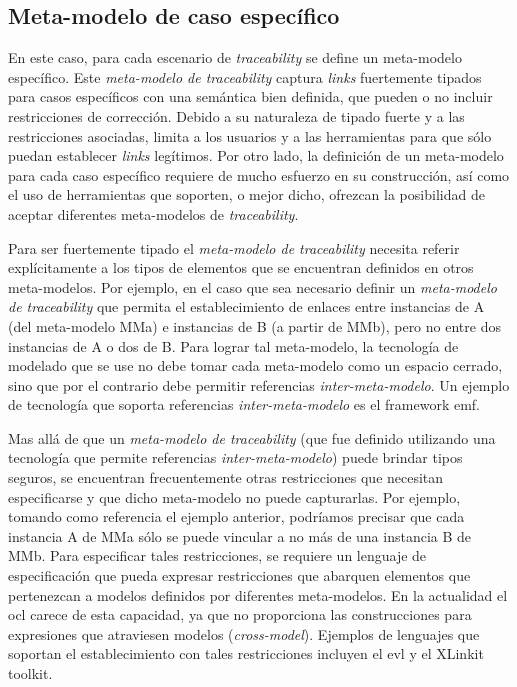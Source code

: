 \documentclass[a4paper,12pt,twoside,spanish,openright]{book}
\begin{document}
\subsection{Meta-modelo de caso específico}

En este caso, para cada escenario de \textit{traceability} se define un meta-modelo específico. Este \textit{meta-modelo de traceability} captura \textit{links} fuertemente tipados para casos específicos con una semántica bien definida, que pueden o no incluir restricciones de corrección. Debido a su naturaleza de tipado fuerte y a las restricciones asociadas, limita a los usuarios y a las herramientas para que sólo puedan establecer \textit{links} legítimos. Por otro lado, la definición de un meta-modelo para cada caso específico requiere de mucho esfuerzo en su construcción, así como el uso de herramientas que soporten, o mejor dicho, ofrezcan la posibilidad de aceptar diferentes meta-modelos de \textit{traceability}.

Para ser fuertemente tipado el \textit{meta-modelo de traceability} necesita referir explícitamente a los tipos de elementos que se encuentran definidos en otros meta-modelos. Por ejemplo, en el caso que sea necesario definir un \textit{meta-modelo de traceability} que permita el establecimiento de enlaces entre instancias de \textsf{A} (del meta-modelo \textsf{MMa}) e instancias de \textsf{B} (a partir de \textsf{MMb}), pero no entre dos instancias de \textsf{A} o dos de \textsf{B}. Para lograr tal meta-modelo, la tecnología de modelado que se use no debe tomar cada meta-modelo como un espacio cerrado, sino que por el contrario debe permitir referencias \textit{inter-meta-modelo}. Un ejemplo de tecnología que soporta referencias \textit{inter-meta-modelo} es el framework \gls{emf}.

Mas allá de que un \textit{meta-modelo de traceability} (que fue definido utilizando una tecnología que permite referencias \textit{inter-meta-modelo}) puede brindar tipos seguros, se encuentran frecuentemente otras restricciones que necesitan especificarse y que dicho meta-modelo no puede capturarlas. Por ejemplo, tomando como referencia el ejemplo anterior, podríamos precisar que cada instancia \textsf{A} de \textsf{MMa} sólo se puede vincular a no más de una instancia \textsf{B} de \textsf{MMb}. Para especificar tales restricciones, se requiere un lenguaje de especificación que pueda expresar restricciones que abarquen elementos que pertenezcan a modelos definidos por diferentes meta-modelos. En la actualidad el \gls{ocl} carece de esta capacidad, ya que no proporciona las construcciones para expresiones que atraviesen modelos (\textit{cross-model}). Ejemplos de lenguajes que soportan el establecimiento con tales restricciones incluyen el \gls{evl} y el XLinkit toolkit.
\end{document}
